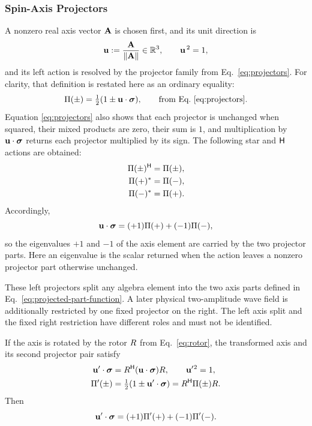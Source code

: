 \subsubsection{Spin-Axis Projectors}
A nonzero real axis vector \(\mathbf{A}\) is chosen first, and its unit
direction is
\[
\mathbf{u}:=\frac{\mathbf{A}}{\|\mathbf{A}\|}\in\mathbb{R}^3,
\qquad
\mathbf{u}^{\,2}=1,
\]
and its left action is resolved by the projector family from
Eq.\ \eqref{eq:projectors}. For clarity, that definition is restated here
as an ordinary equality:
\[
\pv{\Pi}(\pm)=\tfrac12(1\pm\vct{u}\cdot\sigv),
\qquad
\text{from Eq.\ \eqref{eq:projectors}.}
\]
Equation \eqref{eq:projectors} also shows that each projector is unchanged
when squared, their mixed products are zero, their sum is \(1\), and
multiplication by \(\mathbf{u}\cdot\mathbf{\bm{\sigma}}\) returns each projector multiplied by
its sign. The following star and \(\mathsf H\) actions are obtained:
\begin{align*}
\Pi(\pm)^{\mathsf H}&=\Pi(\pm),\\
\Pi(+)^*&=\Pi(-),\\
\Pi(-)^*&=\Pi(+).
\end{align*}
Accordingly,
\begin{equation*}
\mathbf{u}\cdot\mathbf{\bm{\sigma}}=(+1)\Pi(+)+(-1)\Pi(-),
\end{equation*}
so the eigenvalues \(+1\) and \(-1\) of the axis element are carried by the
two projector parts. Here an eigenvalue is the scalar returned when the
action leaves a nonzero projector part otherwise unchanged.

These left projectors split any algebra element into the two axis parts
defined in Eq.\ \eqref{eq:projected-part-function}. A later physical
two-amplitude wave field is additionally restricted by one fixed projector
on the right. The left axis split and the fixed right restriction have
different roles and must not be identified.

If the axis is rotated by the rotor \(R\) from Eq.\ \eqref{eq:rotor},
the transformed axis and its second projector pair satisfy
\begin{equation}
\begin{aligned}
\mathbf{u}'\cdot\mathbf{\bm{\sigma}}&=R^{\mathsf H}(\mathbf{u}\cdot\mathbf{\bm{\sigma}})R,
\qquad
\mathbf{u}'{}^2=1,
\\
\Pi'(\pm)&=\tfrac12(1\pm \mathbf{u}'\cdot\mathbf{\bm{\sigma}})
=R^{\mathsf H}\Pi(\pm)R.
\end{aligned}
\label{eq:rotated-axis-projectors}
\end{equation}
Then
\begin{equation*}
\mathbf{u}'\cdot\mathbf{\bm{\sigma}}=(+1)\Pi'(+)+(-1)\Pi'(-).
\end{equation*}

